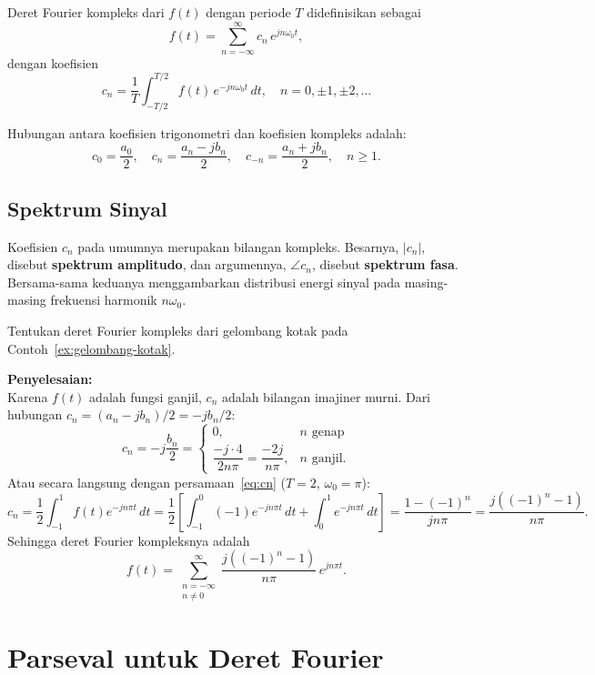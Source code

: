 Deret Fourier kompleks dari $f(t)$ dengan periode $T$ didefinisikan sebagai
\begin{equation}
f(t) = \sum_{n=-\infty}^{\infty} c_n\,e^{jn\omega_0 t},
\label{eq:fourier-kompleks}
\end{equation}
dengan koefisien
\begin{equation}
c_n = \frac{1}{T}\int_{-T/2}^{T/2} f(t)\,e^{-jn\omega_0 t}\,dt, \quad n = 0,\pm 1, \pm 2, \ldots
\label{eq:cn}
\end{equation}

Hubungan antara koefisien trigonometri dan koefisien kompleks adalah:
\[
c_0 = \frac{a_0}{2}, \quad c_n = \frac{a_n - jb_n}{2}, \quad c_{-n} = \frac{a_n + jb_n}{2}, \quad n \ge 1.
\]

\subsection{Spektrum Sinyal}

Koefisien $c_n$ pada umumnya merupakan bilangan kompleks. Besarnya, $|c_n|$, disebut \textbf{spektrum amplitudo}, dan argumennya, $\angle c_n$, disebut \textbf{spektrum fasa}. Bersama-sama keduanya menggambarkan distribusi energi sinyal pada masing-masing frekuensi harmonik $n\omega_0$.

\begin{exmp}
Tentukan deret Fourier kompleks dari gelombang kotak pada Contoh~\ref{ex:gelombang-kotak}.

\textbf{Penyelesaian:}\\
Karena $f(t)$ adalah fungsi ganjil, $c_n$ adalah bilangan imajiner murni. Dari hubungan $c_n = (a_n - jb_n)/2 = -jb_n/2$:
\[
c_n = -j\frac{b_n}{2} = \begin{cases} 0, & n \text{ genap} \\ \dfrac{-j\cdot 4}{2n\pi} = \dfrac{-2j}{n\pi}, & n \text{ ganjil}. \end{cases}
\]
Atau secara langsung dengan persamaan~\ref{eq:cn} ($T=2$, $\omega_0=\pi$):
\[
c_n = \frac{1}{2}\int_{-1}^{1}f(t)e^{-jn\pi t}\,dt
    = \frac{1}{2}\left[\int_{-1}^{0}(-1)e^{-jn\pi t}\,dt + \int_{0}^{1}e^{-jn\pi t}\,dt\right]
    = \frac{1-(-1)^n}{jn\pi} = \frac{j((-1)^n-1)}{n\pi}.
\]
Sehingga deret Fourier kompleksnya adalah
\[
f(t) = \sum_{\substack{n=-\infty\\n\neq 0}}^{\infty} \frac{j((-1)^n-1)}{n\pi}\,e^{jn\pi t}.
\]
\end{exmp}

\section{Parseval untuk Deret Fourier}

